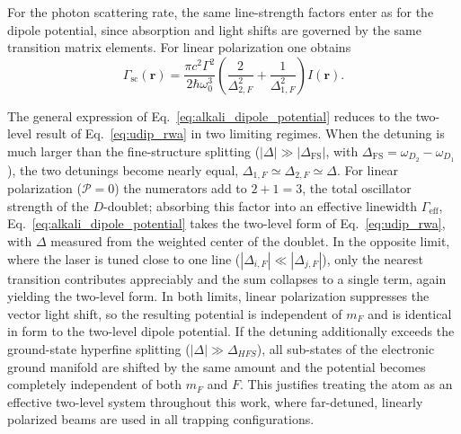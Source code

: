 For the photon scattering rate, the same line-strength factors enter as for the dipole potential, since absorption and light shifts are governed by the same transition matrix elements. For linear polarization one obtains~\cite{Grimm:00}
\begin{equation}
\Gamma_{\mathrm{sc}}(\mathbf{r}) = \frac{\pi c^2 \Gamma^2}{2\hbar\omega_0^3}\left(\frac{2}{\Delta_{2,F}^2} + \frac{1}{\Delta_{1,F}^2}\right) I(\mathbf{r}).
\label{eq:alkali_scattering_rate}
\end{equation}

The general expression of Eq.~\ref{eq:alkali_dipole_potential} reduces to the two-level result of Eq.~\ref{eq:udip_rwa} in two limiting regimes. When the detuning is much larger than the fine-structure splitting ($|\Delta| \gg |\Delta_{\mathrm{FS}}|$, with $\Delta_{\mathrm{FS}} = \omega_{D_2} - \omega_{D_1}$), the two detunings become nearly equal, $\Delta_{1,F} \simeq \Delta_{2,F} \simeq \Delta$. For linear polarization ($\mathcal{P}=0$) the numerators add to $2+1=3$, the total oscillator strength of the $D$-doublet; absorbing this factor into an effective linewidth $\Gamma_{\mathrm{eff}}$, Eq.~\ref{eq:alkali_dipole_potential} takes the two-level form of Eq.~\ref{eq:udip_rwa}, with $\Delta$ measured from the weighted center of the doublet. In the opposite limit, where the laser is tuned close to one line ($|\Delta_{i,F}| \ll |\Delta_{j,F}|$), only the nearest transition contributes appreciably and the sum collapses to a single term, again yielding the two-level form. In both limits, linear polarization suppresses the vector light shift, so the resulting potential is independent of $m_F$ and is identical in form to the two-level dipole potential. If the detuning additionally exceeds the ground-state hyperfine splitting ($|\Delta| \gg \Delta_{HFS}$), all sub-states of the electronic ground manifold are shifted by the same amount and the potential becomes completely independent of both $m_F$ and $F$. This justifies treating the atom as an effective two-level system throughout this work, where far-detuned, linearly polarized beams are used in all trapping configurations.
